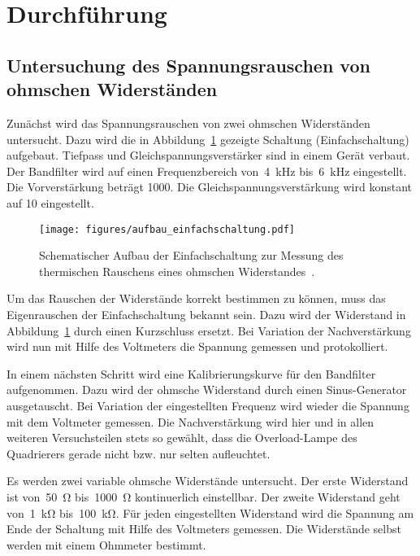 \section{Durchführung}
\label{sec:durchführung}

\subsection{Untersuchung des Spannungsrauschen von ohmschen Widerständen}

Zunächst wird das Spannungsrauschen von zwei ohmschen Widerständen untersucht.
Dazu wird die in Abbildung~\ref{fig:aufbau_einfachschaltung} gezeigte Schaltung
(Einfachschaltung) aufgebaut. Tiefpass und Gleichspannungsverstärker sind in
einem Gerät verbaut. Der Bandfilter wird auf einen Frequenzbereich
von~\SI{4}{\kilo\hertz} bis~\SI{6}{\kilo\hertz} eingestellt. Die Vorverstärkung
beträgt 1000. Die Gleichspannungsverstärkung wird konstant auf 10 eingestellt.

\begin{figure}
  \centering
  \texttt{[image: figures/aufbau\_einfachschaltung.pdf]}
  \caption{Schematischer Aufbau der Einfachschaltung zur Messung des thermischen
  Rauschens eines ohmschen Widerstandes~\cite{V57}.}
  \label{fig:aufbau_einfachschaltung}
\end{figure}

Um das Rauschen der Widerstände korrekt bestimmen zu können, muss das
Eigenrauschen der Einfachschaltung bekannt sein. Dazu wird der Widerstand in
Abbildung~\ref{fig:aufbau_einfachschaltung} durch einen Kurzschluss ersetzt. Bei
Variation der Nachverstärkung wird nun mit Hilfe des Voltmeters die Spannung
gemessen und protokolliert.

In einem nächsten Schritt wird eine Kalibrierungskurve für den Bandfilter
aufgenommen. Dazu wird der ohmsche Widerstand durch einen Sinus-Generator
ausgetauscht. Bei Variation der eingestellten Frequenz wird wieder die Spannung
mit dem Voltmeter gemessen. Die Nachverstärkung wird hier und in allen weiteren
Versuchsteilen stets so gewählt, dass die Overload-Lampe des Quadrierers gerade
nicht bzw. nur selten aufleuchtet.

Es werden zwei variable ohmsche Widerstände untersucht. Der erste Widerstand ist
von~\SI{50}{\ohm} bis~\SI{1000}{\ohm} kontinuerlich einstellbar. Der zweite
Widerstand geht von~\SI{1}{\kilo\ohm} bis~\SI{100}{\kilo\ohm}. Für jeden
eingestellten Widerstand wird die Spannung am Ende der Schaltung mit Hilfe des
Voltmeters gemessen. Die Widerstände selbst werden mit einem Ohmmeter bestimmt.

